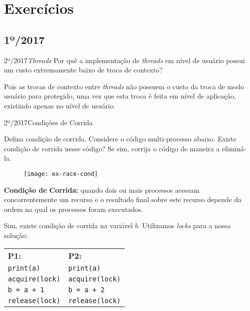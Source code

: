 \chapter{Exercícios}


\section{1º/2017}
\begin{exercicio}
  {2º/2017}{\textit{Threads}}
  {Por quê a implementação de \textit{threads} em nível de usuário possui um custo extremamente baixo de troca de contexto?}

  Pois as trocas de contexto entre \textit{threads} não possuem o custo da troca de modo usuário para protegido, uma vez que esta troca é feita em nível de aplicação, existindo apenas no nível de usuário.
\end{exercicio}

\begin{exercicio}
  {2º/2017}{Condições de Corrida}
  {Defina condição de corrida. Considere o código multi-processo abaixo. Existe condição de corrida nesse código? Se sim, corrija o código de maneira a eliminá-la.
  \begin{figure}[H]
    \centering
    \texttt{[image: ex-race-cond]}
  \end{figure}}

  \textbf{Condição de Corrida:} quando dois ou mais processos acessam concorrentemente um recurso e o resultado final sobre este recurso depende da ordem na qual os processos foram executados.

  Sim, existe condição de corrida na variável $b$. Utilizamos \textit{locks} para a nossa solução:

  \begin{table}[H]
    \centering
    \begin{tabular}{l|l}
      \textbf{P1:}            & \textbf{P2:} \\
      \texttt{print(a)}       & \texttt{print(a)} \\
      \texttt{acquire(lock)}  & \texttt{acquire(lock)} \\
      \texttt{b = a + 1}      & \texttt{b = a + 2} \\
      \texttt{release(lock)}  & \texttt{release(lock)}\\
    \end{tabular}
  \end{table}
\end{exercicio}

